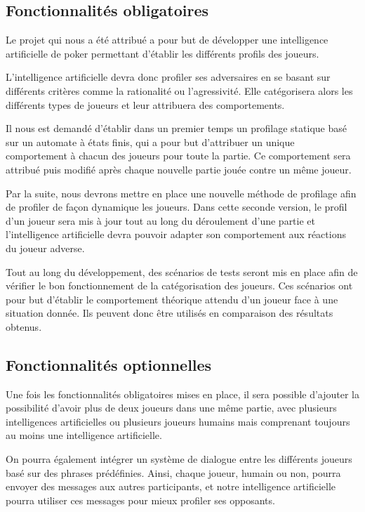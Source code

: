 \documentclass{report}
\begin{document}
\subsection{Fonctionnalités obligatoires}

\hspace{0.5cm}Le projet qui nous a été attribué a pour but de développer une intelligence artificielle de poker permettant d'établir les différents profils des joueurs.\par
L'intelligence artificielle devra donc profiler ses adversaires en se basant sur différents critères comme la rationalité ou l'agressivité. Elle catégorisera alors les différents types de joueurs et leur attribuera des comportements.\par
Il nous est demandé d'établir dans un premier temps un profilage statique basé sur un automate à états finis, qui a pour but d'attribuer un unique comportement à chacun des joueurs pour toute la partie. Ce comportement sera attribué puis modifié après chaque nouvelle partie jouée contre un même joueur.\par
Par la suite, nous devrons mettre en place une nouvelle méthode de profilage afin de profiler de façon dynamique les joueurs. Dans cette seconde version, le profil d'un joueur sera mis à jour tout au long du déroulement d'une partie et l'intelligence artificielle devra pouvoir adapter son comportement aux réactions du joueur adverse.\par
Tout au long du développement, des scénarios de tests seront mis en place afin de vérifier le bon fonctionnement de la catégorisation des joueurs. Ces scénarios ont pour but d'établir le comportement théorique attendu d'un joueur face à une situation donnée. Ils peuvent donc être utilisés en comparaison des résultats obtenus.\par

\subsection{Fonctionnalités optionnelles}

\hspace{0.5cm}Une fois les fonctionnalités obligatoires mises en place, il sera possible d'ajouter la possibilité d'avoir plus de deux joueurs dans une même partie, avec plusieurs intelligences artificielles ou plusieurs joueurs humains mais comprenant toujours au moins une intelligence artificielle.\par
On pourra également intégrer un système de dialogue entre les différents joueurs basé sur des phrases prédéfinies. Ainsi, chaque joueur, humain ou non, pourra envoyer des messages aux autres participants, et notre intelligence artificielle pourra utiliser ces messages pour mieux profiler ses opposants.\par 
\end{document}
